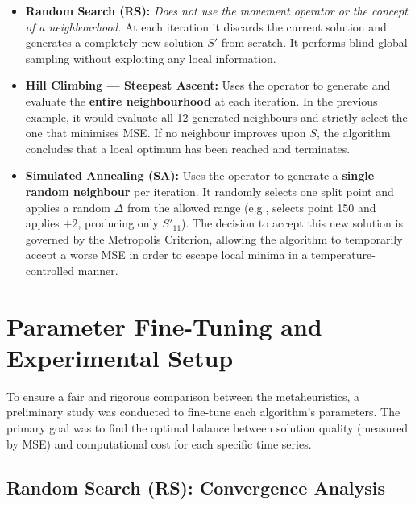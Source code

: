 \documentclass[12pt, a4paper]{article}
\begin{document}
\begin{itemize}[itemsep=0.3em]
  \item \textbf{Random Search (RS):} \emph{Does not use the movement operator or the
          concept of a neighbourhood.} At each iteration it discards the current solution and
        generates a completely new solution $S'$ from scratch. It performs blind global
        sampling without exploiting any local information.

  \item \textbf{Hill Climbing --- Steepest Ascent:} Uses the operator to generate and
        evaluate the \textbf{entire neighbourhood} at each iteration. In the previous
        example, it would evaluate all 12 generated neighbours and strictly select the one
        that minimises MSE. If no neighbour improves upon $S$, the algorithm concludes that
        a local optimum has been reached and terminates.

  \item \textbf{Simulated Annealing (SA):} Uses the operator to generate a
        \textbf{single random neighbour} per iteration. It randomly selects one split point
        and applies a random $\Delta$ from the allowed range (e.g., selects point 150 and
        applies $+2$, producing only $S'_{11}$). The decision to accept this new solution
        is governed by the Metropolis Criterion, allowing the algorithm to temporarily
        accept a worse MSE in order to escape local minima in a temperature-controlled
        manner.
\end{itemize}

\section{Parameter Fine-Tuning and Experimental Setup}

To ensure a fair and rigorous comparison between the metaheuristics, a preliminary
study was conducted to fine-tune each algorithm's parameters. The primary goal was to
find the optimal balance between solution quality (measured by MSE) and computational
cost for each specific time series.

\subsection{Random Search (RS): Convergence Analysis}
\end{document}
